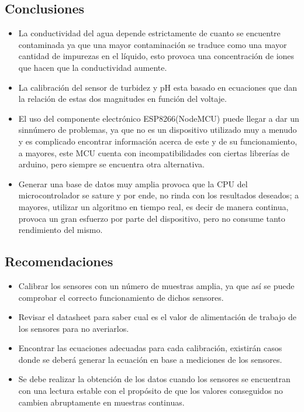 \documentclass[10pt,a4paper]{article}
\begin{document}
\subsection*{Conclusiones}
\begin{itemize}
\item La conductividad del agua depende estrictamente de cuanto se encuentre contaminada ya que una mayor contaminación se traduce como una mayor cantidad de impurezas en el líquido, esto provoca una concentración de iones que hacen que la conductividad aumente.   
\item La calibración del sensor de turbidez y pH esta basado en ecuaciones que dan la relación de estas dos magnitudes en función del voltaje.
\item El uso del componente electrónico ESP8266(NodeMCU) puede llegar a dar un sinnúmero de problemas, ya que no es un dispositivo utilizado muy a menudo y es complicado encontrar información acerca de este y de su funcionamiento, a mayores, este MCU cuenta con incompatibilidades con ciertas librerías de arduino, pero siempre se encuentra otra alternativa.
\item Generar una base de datos muy amplia provoca que la CPU del microcontrolador se sature y por ende, no rinda con los resultados deseados; a mayores, utilizar un algoritmo en tiempo real, es decir de manera continua, provoca un gran esfuerzo por parte del dispositivo, pero no consume tanto rendimiento del mismo.
\end{itemize}

\subsection*{Recomendaciones}
\begin{itemize}
\renewcommand{\labelitemi}{$*$}
\item Calibrar los sensores con un número de muestras amplia, ya que así se puede comprobar el correcto funcionamiento de dichos sensores.
\item Revisar el datasheet para saber cual es el valor de alimentación de trabajo de los sensores para no averiarlos.
\item Encontrar las ecuaciones adecuadas para cada calibración, existirán casos donde se deberá generar la ecuación en base a mediciones de los sensores.
\item Se debe realizar la obtención de los datos cuando los sensores se encuentran con una lectura estable con el propósito de que los valores conseguidos no cambien abruptamente en muestras continuas.
\end{itemize}
\end{document}
